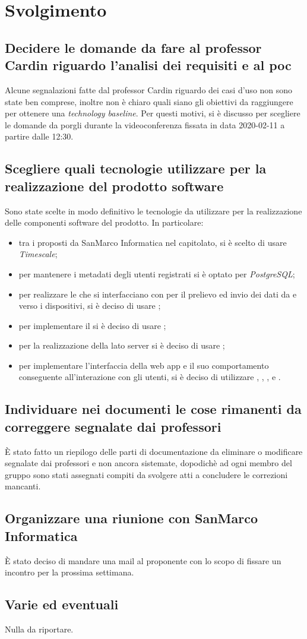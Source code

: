 \newpage
\section*{Svolgimento}

	\subsection*{Decidere le domande da fare al professor Cardin riguardo l'analisi dei requisiti e al poc}
		Alcune segnalazioni fatte dal professor Cardin riguardo dei casi d'uso non sono state ben comprese, inoltre non è chiaro quali siano gli obiettivi da raggiungere per ottenere una \textit{technology baseline}.  Per questi motivi, si è discusso per scegliere le domande da porgli durante la videoconferenza fissata in data 2020-02-11 a partire dalle 12:30.

	\subsection*{Scegliere quali tecnologie utilizzare per la realizzazione del prodotto software}
		Sono state scelte in modo definitivo le tecnologie da utilizzare per la realizzazione delle componenti software del prodotto. In particolare:
		\begin{itemize}
				\item tra i  proposti da SanMarco Informatica nel capitolato, si è scelto di usare \textit{Timescale};
				\item per mantenere i metadati degli utenti registrati si è optato per \textit{PostgreSQL};
				\item per realizzare le  che si interfacciano con  per il prelievo ed invio dei dati da e verso i dispositivi, si è deciso di usare ;
				\item per implementare il  si è deciso di usare ;
				\item per la realizzazione della  lato server si è deciso di usare ;
				\item per implementare l'interfaccia della web app e il suo comportamento conseguente all'interazione con gli utenti, si è deciso di utilizzare ,
				, ,  e .
			\end{itemize}

	\subsection*{Individuare nei documenti le cose rimanenti da correggere segnalate dai professori}
		È stato fatto un riepilogo delle parti di documentazione da eliminare o modificare segnalate dai professori e non ancora sistemate, dopodichè ad ogni membro del gruppo sono stati assegnati compiti da svolgere atti a concludere le correzioni mancanti.

	\subsection*{Organizzare una riunione con SanMarco Informatica}
		È stato deciso di mandare una mail al proponente con lo scopo di fissare un incontro per la prossima settimana.
		\subsection*{Varie ed eventuali}
		Nulla da riportare.